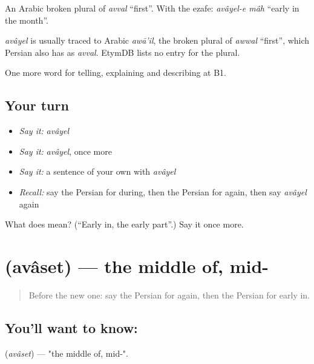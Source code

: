 An Arabic broken plural of \emph{avval} \textquotedblleft{}first\textquotedblright{}. With the ezafe: \emph{avâyel-e mâh} \textquotedblleft{}early in the month\textquotedblright{}.

\begin{cousinweb}
\emph{avâyel} is usually traced to Arabic \emph{awā'il}, the broken plural of \emph{awwal} \textquotedblleft{}first\textquotedblright{}, which Persian also has as \emph{avval}. EtymDB lists no entry for the plural.
\end{cousinweb}

\begin{grammarlens}[title={What you've built}]
One more word for telling, explaining and describing at B1.
\end{grammarlens}

\subsection*{Your turn}
\begin{itemize}
\raggedright
  \item \emph{Say it:} \emph{avâyel}
  \item \emph{Say it:} \emph{avâyel}, once more
  \item \emph{Say it:} a sentence of your own with \emph{avâyel}
  \item \emph{Recall:} say the Persian for during, then the Persian for again, then say \emph{avâyel} again
\end{itemize}

\begin{tcolorbox}[breakable,colback=teal!4,colframe=teal!35!black,title={Before you move on}]
What does  mean? (\textquotedblleft{}Early in, the early part\textquotedblright{}.) Say it once more.
\end{tcolorbox}
\section[\texorpdfstring{\fa{اواسط} (avâset)}{اواسط (avâset)}]{ (avâset) — the middle of, mid-}

\label{lesson:FA-C307-avaset}



\begin{quote}
Before the new one: say the Persian for again, then the Persian for early in.
\end{quote}

\subsection*{You'll want to know: }
\textbf{} (\emph{avâset}) — "the middle of, mid-".

